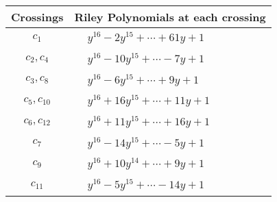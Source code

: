\documentclass[1p]{elsarticle_modified}
\theoremstyle{definition}
\begin{document}
\begin{tabular}{m{50pt}|m{274pt}}
Crossings & \hspace{64pt}Riley Polynomials at each crossing \\
\hline $$\begin{aligned}c_{1}\end{aligned}$$&$\begin{aligned}
&y^{16}-2 y^{15}+\cdots+61 y+1
\end{aligned}$\\
\hline $$\begin{aligned}c_{2},c_{4}\end{aligned}$$&$\begin{aligned}
&y^{16}-10 y^{15}+\cdots-7 y+1
\end{aligned}$\\
\hline $$\begin{aligned}c_{3},c_{8}\end{aligned}$$&$\begin{aligned}
&y^{16}-6 y^{15}+\cdots+9 y+1
\end{aligned}$\\
\hline $$\begin{aligned}c_{5},c_{10}\end{aligned}$$&$\begin{aligned}
&y^{16}+16 y^{15}+\cdots+11 y+1
\end{aligned}$\\
\hline $$\begin{aligned}c_{6},c_{12}\end{aligned}$$&$\begin{aligned}
&y^{16}+11 y^{15}+\cdots+16 y+1
\end{aligned}$\\
\hline $$\begin{aligned}c_{7}\end{aligned}$$&$\begin{aligned}
&y^{16}-14 y^{15}+\cdots-5 y+1
\end{aligned}$\\
\hline $$\begin{aligned}c_{9}\end{aligned}$$&$\begin{aligned}
&y^{16}+10 y^{14}+\cdots+9 y+1
\end{aligned}$\\
\hline $$\begin{aligned}c_{11}\end{aligned}$$&$\begin{aligned}
&y^{16}-5 y^{15}+\cdots-14 y+1
\end{aligned}$\\
\hline
\end{tabular}\\~\\
\end{document}
